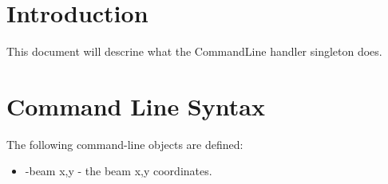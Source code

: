 \documentclass[a4paper, 11pt]{article}
\begin{document}
\section{Introduction}

This document will descrine what the CommandLine handler singleton does.

\section{Command Line Syntax}

The following command-line objects are defined:

\begin{itemize}
\item{-beam x,y - the beam x,y coordinates.}
\end{itemize}
\end{document}
